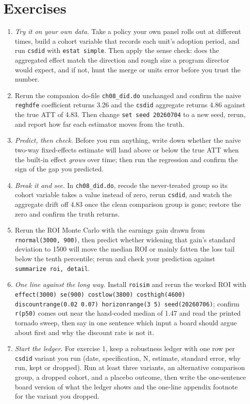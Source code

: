 \documentclass[
    a4paper,
    fontsize=10pt,
    twoside=true,
    numbers=noenddot,
]{kaobook}
\begin{document}
\section*{Exercises}
\begin{enumerate}
  \item \emph{Try it on your own data.} Take a policy your own panel rolls out at different times, build a cohort variable that records each unit's adoption period, and run \texttt{csdid} with \texttt{estat simple}. Then apply the sense check: does the aggregated effect match the direction and rough size a program director would expect, and if not, hunt the merge or units error before you trust the number.
  \item Rerun the companion do-file \texttt{ch08\_did.do} unchanged and confirm the naive \texttt{reghdfe} coefficient returns 3.26 and the \texttt{csdid} aggregate returns 4.86 against the true ATT of 4.83. Then change \texttt{set seed 20260704} to a new seed, rerun, and report how far each estimator moves from the truth.
  \item \emph{Predict, then check.} Before you run anything, write down whether the naive two-way fixed-effects estimate will land above or below the true ATT when the built-in effect \emph{grows} over time; then run the regression and confirm the sign of the gap you predicted.
  \item \emph{Break it and see.} In \texttt{ch08\_did.do}, recode the never-treated group so its cohort variable takes a value instead of zero, rerun \texttt{csdid}, and watch the aggregate drift off 4.83 once the clean comparison group is gone; restore the zero and confirm the truth returns.
  \item Rerun the ROI Monte Carlo with the earnings gain drawn from \texttt{rnormal(3000, 900)}, then predict whether widening that gain's standard deviation to 1500 will move the median ROI or mainly fatten the loss tail below the tenth percentile; rerun and check your prediction against \texttt{summarize roi, detail}.
  \item \emph{One line against the long way.} Install \texttt{roisim} and rerun the worked ROI with \texttt{effect(3000) se(900) costlow(3800) costhigh(4600) discountrange(0.02 0.07) horizonrange(3 5) seed(20260706)}; confirm \texttt{r(p50)} comes out near the hand-coded median of 1.47 and read the printed tornado sweep, then say in one sentence which input a board should argue about first and why the discount rate is not it.
  \item \emph{Start the ledger.} For exercise 1, keep a robustness ledger with one row per \texttt{csdid} variant you run (date, specification, N, estimate, standard error, why run, kept or dropped). Run at least three variants, an alternative comparison group, a dropped cohort, and a placebo outcome, then write the one-sentence board version of what the ledger shows and the one-line appendix footnote for the variant you dropped.
\end{enumerate}
\end{document}
